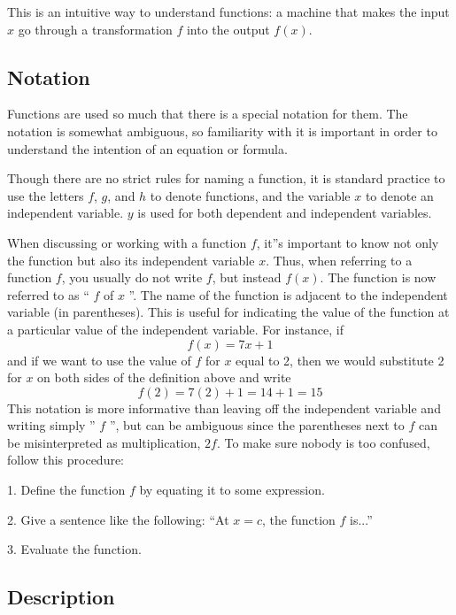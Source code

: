This is an intuitive way to understand functions: a machine that makes the input $x$ go through a transformation $f$ into the output $f(x)$.


\subsection{Notation}
\label{sss:nota-71f9}

Functions are used so much that there is a special notation for them. The notation is
somewhat ambiguous, so familiarity with it is important in order to understand the
intention of an equation or formula.

Though there are no strict rules for naming a function, it is standard practice to use the letters $f$, $g$, and $h$ to denote functions, and the variable $x$ to denote an independent variable. $y$ is used for both dependent and independent variables.

When discussing or working with a function $f$, it''s important to know not only the function but also its independent variable $x$. Thus, when referring to a function $f$, you usually do not write $f$, but instead $f(x)$. The function is now referred to as `` $f$ of $x$ ''. The name of the function is adjacent to the independent variable (in parentheses). This is useful for indicating the value of the function at a particular value of the independent variable. For instance, if 
\[
f(x) = 7x + 1
\]
and if we want to use the value of $f$ for $x$ equal to 2, then we would substitute 2 for $x$ on both sides of the definition above and write
\[
f(2) = 7(2) + 1 = 14 + 1 = 15
\]
This notation is more informative than leaving off the independent variable and writing simply '' $f$ '', but can be ambiguous since the parentheses next to $f$ can be misinterpreted as multiplication, $2f$. To make sure nobody is too confused, follow this procedure:

1. Define the function $f$ by equating it to some expression.

2. Give a sentence like the following: ``At $x = c$, the function $f$ is...''

3. Evaluate the function.

\subsection{Description}
\label{sss:desc-67da}

